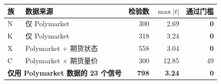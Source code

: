 \setlength{\tabcolsep}{5pt}
\begin{tabular}{llrrr}
\toprule
族 & 数据来源 & 检验数 & $\max|t|$ & 通过门槛 \\
\midrule
N & 仅 Polymarket & 300 & 2.69 & \textbf{0} \\
K & 仅 Polymarket & 318 & 3.24 & \textbf{0} \\
X & Polymarket $+$ 期货状态 & 558 & 3.04 & \textbf{0} \\
C & Polymarket $\times$ 期货量价 & 300 & 12.85 & 49 \\
\midrule
\multicolumn{2}{l}{\textbf{仅用 Polymarket 数据的 23 个信号}} & \textbf{798} & \textbf{3.24} & \textbf{0} \\
\bottomrule
\end{tabular}
